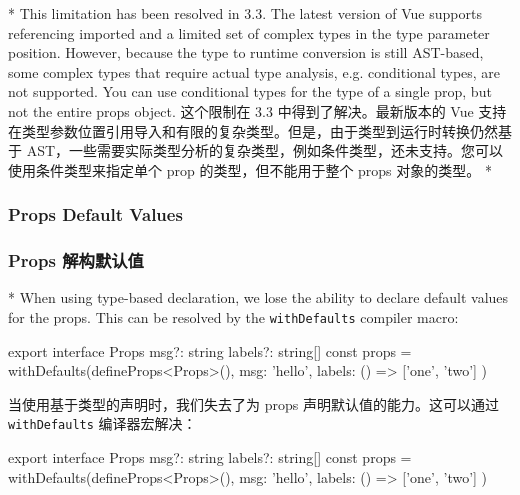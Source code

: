 \begin{paracol}{2} 
 
\switchcolumn[0]*%
This limitation has been resolved in 3.3. The latest version of Vue
supports referencing imported and a limited set of complex types in the
type parameter position. However, because the type to runtime conversion
is still AST-based, some complex types that require actual type
analysis, e.g. conditional types, are not supported. You can use
conditional types for the type of a single prop, but not the entire
props object.
\switchcolumn
这个限制在 3.3 中得到了解决。最新版本的 Vue
支持在类型参数位置引用导入和有限的复杂类型。但是，由于类型到运行时转换仍然基于
AST，一些需要实际类型分析的复杂类型，例如条件类型，还未支持。您可以使用条件类型来指定单个
prop 的类型，但不能用于整个 props 对象的类型。
\switchcolumn[0]*%
\subsubsection{Props Default Values}
\switchcolumn
\subsubsection{Props 解构默认值}
\switchcolumn[0]*%
When using type-based declaration, we lose the ability to declare
default values for the props. This can be resolved by the
\texttt{withDefaults} compiler macro:
\begin{codeTs}
export interface Props {
  msg?: string
  labels?: string[]
}
const props = withDefaults(defineProps<Props>(), {
  msg: 'hello',
  labels: () => ['one', 'two'] 
})
\end{codeTs}
\switchcolumn
当使用基于类型的声明时，我们失去了为 props 声明默认值的能力。这可以通过
\texttt{withDefaults} 编译器宏解决：
\begin{codeTs}
    export interface Props {
      msg?: string
      labels?: string[]
    }
    const props = withDefaults(defineProps<Props>(), {
      msg: 'hello',
      labels: () => ['one', 'two']
    })
    \end{codeTs}
\end{paracol}



\begin{paracol}{2} 

\end{paracol}


\begin{paracol}{2} 

\end{paracol}



\begin{paracol}{2} 

\end{paracol}
